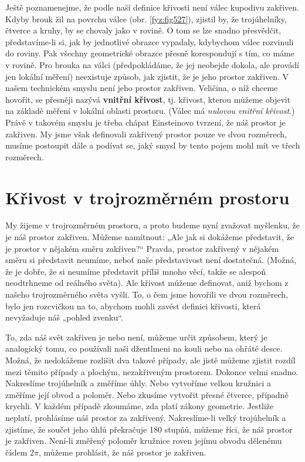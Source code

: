     Ještě poznamenejme, že podle naší definice křivosti není válec kupodivu zakřiven. Kdyby brouk 
    žil na povrchu válce (obr. \ref{fyz:fig527}), zjistil by, že trojúhelníky, čtverce a kruhy, by 
    se chovaly jako v rovině. O tom se lze snadno přesvědčit, představíme-li si, jak by jednotlivé 
    obrazce vypadaly, kdybychom válec rozvinuli do roviny. Pak všechny geometrické obrazce přesně 
    korespondují s tím, co máme v rovině. Pro brouka na válci (předpokládáme, že jej neobejde 
    dokola, ale provádí jen lokální měření) neexistuje způsob, jak zjistit, že je jeho prostor 
    zakřiven. V našem technickém smyslu není jeho prostor zakřiven. Veličina, o níž chceme hovořit, 
    se přesněji nazývá \textbf{vnitřní křivost}, tj. křivost, kterou můžeme objevit na základě 
    měření v lokální oblasti prostoru. (Válec má \emph{nulovou vnitřní křivost}.) Právě v takovém 
    smyslu je třeba chápat Einsteinovo tvrzení, že náš prostor je zakřiven. My jsme však definovali 
    zakřivený prostor pouze ve dvou rozměrech, musíme postoupit dále a podívat se, jaký smysl by 
    tento pojem mohl mít ve třech rozměrech.
    
  \section{Křivost v trojrozměrném prostoru}\label{fyz:IIchapXLIIsecII}
    My žijeme v trojrozměrném prostoru, a proto budeme nyní zvažovat myšlenku, že je náš prostor 
    zakřiven. Můžeme namítnout: „Ale jak si dokážeme představit, že je prostor v nějakém směru 
    zakřiven?“ Pravda, prostor zakřivený v nějakém směru si představit neumíme, neboť naše 
    představivost není dostatečná. (Možná, že je dobře, že si neumíme představit příliš mnoho věcí, 
    takže se alespoň neodtrhneme od reálného světa). Ale křivost můžeme definovat, aniž bychom z 
    našeho trojrozměrného světa vyšli. To, o čem jsme hovořili ve dvou rozměrech, bylo jen 
    rozcvičkou na to, abychom mohli zavést definici křivosti, která nevyžaduje náš „pohled zvenku“.
    
    To, zda náš svět zakřiven je nebo není, můžeme určit způsobem, který je analogický tomu, co 
    používali naši džentlmeni na kouli nebo na ohřáté desce. Možná, že nedokážeme rozlišit dva 
    takové případy, ale jistě můžeme zjistit rozdíl mezi těmito případy a plochým, nezakřiveným 
    prostorem. Dokonce velmi snadno. Nakreslíme trojúhelník a změříme úhly. Nebo vytvoříme velkou 
    kružnici a změříme její obvod a poloměr. Nebo zkusíme vytvořit přesné čtverce, případně 
    krychli. V každém případě zkoumáme, zda platí zákony geometrie. Jestliže neplatí, prohlásíme 
    náš prostor za zakřivený. Nakreslíme-li velký trojúhelník a zjistíme, že součet jeho úhlů 
    překračuje \num{180} stupňů, můžeme říci, že náš prostor je zakřiven. Není-li změřený poloměr 
    kružnice roven jejímu obvodu dělenému číslem \(2\pi\), můžeme prohlásit, že náš prostor je 
    zakřiven.
    
